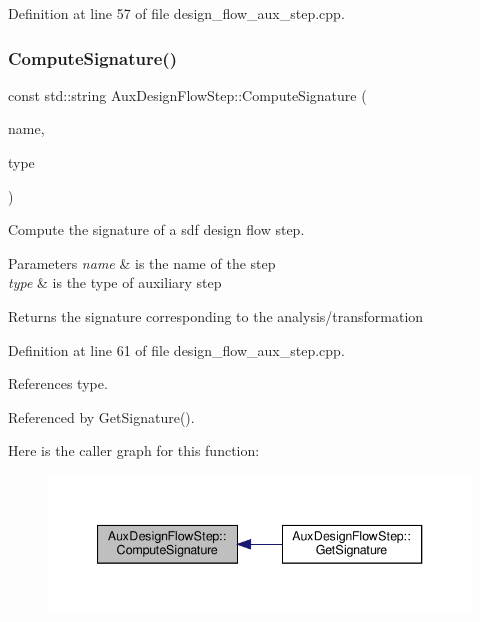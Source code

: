 Definition at line 57 of file design\+\_\+flow\+\_\+aux\+\_\+step.\+cpp.

\mbox{\label{classAuxDesignFlowStep_a2bc08e75088f339b9ed846ce917503f7}} 
\subsubsection{\texorpdfstring{Compute\+Signature()}{ComputeSignature()}}
{\footnotesize\ttfamily const std\+::string Aux\+Design\+Flow\+Step\+::\+Compute\+Signature (\begin{DoxyParamCaption}\item[{const std\+::string \&}]{name,  }\item[{const \hyperlink{design__flow__aux__step_8hpp_a11050839fc7a6c59f7ec7eb2d1f1568b}{Aux\+Design\+Flow\+Step\+Type}}]{type }\end{DoxyParamCaption})\hspace{0.3cm}{\ttfamily [static]}}



Compute the signature of a sdf design flow step. 


\begin{DoxyParams}{Parameters}
{\em name} & is the name of the step \\
\hline
{\em type} & is the type of auxiliary step \\
\hline
\end{DoxyParams}
\begin{DoxyReturn}{Returns}
the signature corresponding to the analysis/transformation 
\end{DoxyReturn}


Definition at line 61 of file design\+\_\+flow\+\_\+aux\+\_\+step.\+cpp.



References type.



Referenced by Get\+Signature().

Here is the caller graph for this function\+:
\nopagebreak
\begin{figure}[H]
\begin{center}
\leavevmode
\includegraphics[width=340pt]{db/df5/classAuxDesignFlowStep_a2bc08e75088f339b9ed846ce917503f7_icgraph}
\end{center}
\end{figure}
\mbox{\label{classAuxDesignFlowStep_a74c09957fafe9160d82120a4fa2f3e7f}} 
